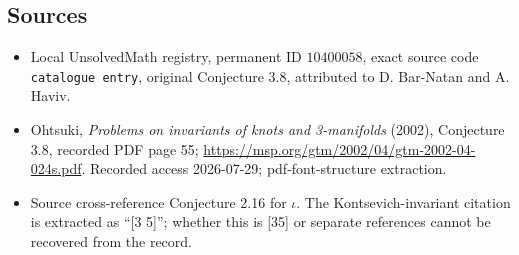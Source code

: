\documentclass[11pt]{article}
\begin{document}
\subsection{Sources}
\begin{itemize}
\item Local UnsolvedMath registry, permanent ID \(10400058\), exact source code \texttt{catalogue entry}, original Conjecture 3.8, attributed to D. Bar-Natan and A. Haviv.
\item Ohtsuki, \emph{Problems on invariants of knots and 3-manifolds} (2002), Conjecture 3.8, recorded PDF page 55; \url{https://msp.org/gtm/2002/04/gtm-2002-04-024s.pdf}. Recorded access 2026-07-29; pdf-font-structure extraction.
\item Source cross-reference Conjecture 2.16 for \(\iota\). The Kontsevich-invariant citation is extracted as ``[3 5]''; whether this is [35] or separate references cannot be recovered from the record.
\end{itemize}
\end{document}
